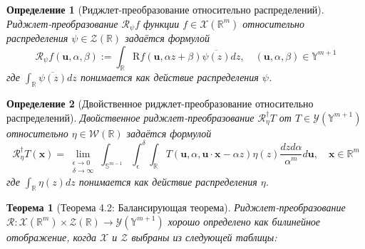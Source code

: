 \documentclass[12pt]{article}
\newtheorem{theorem}{Теорема}
\newtheorem{definition}{Определение}
\begin{document}
\begin{definition}[Риджлет-преобразование относительно распределений]
	Риджлет-преобразование \( \mathscr{R}_{\psi}f \) функции \( f \in \mathcal{X}(\mathbb{R}^m) \) относительно распределения \( \psi \in \mathcal{Z}(\mathbb{R}) \) задаётся формулой
	\[
	\mathscr{R}_{\psi}f(\mathbf{u}, \alpha, \beta) := \int_{\mathbb{R}} \mathrm{R}f(\mathbf{u}, \alpha z + \beta) \overline{\psi(z)}dz, \quad (\mathbf{u}, \alpha, \beta) \in \mathbb{Y}^{m+1}
	\]
	где \( \int_{\mathbb{R}} \overline{\psi(z)}dz \) понимается как действие распределения \( \psi \).
\end{definition}

\begin{definition}[Двойственное риджлет-преобразование относительно распределений]
	Двойственное риджлет-преобразование \( \mathscr{R}_\eta^\dagger T \) от \( T \in \mathcal{Y}(\mathbb{Y}^{m+1}) \) относительно \( \eta \in \mathcal{W}(\mathbb{R}) \) задаётся формулой
	\[
	\mathscr{R}_\eta^\dagger T(\mathbf{x}) = \lim_{\substack{\epsilon \to 0 \\ \delta \to \infty}} \int_{\mathbb{S}^{m-1}} \int_{\epsilon}^{\delta} \int_{\mathbb{R}} T(\mathbf{u}, \alpha, \mathbf{u} \cdot \mathbf{x} - \alpha z) \eta(z) \frac{dz d\alpha}{\alpha^m} d\mathbf{u}, \quad \mathbf{x} \in \mathbb{R}^m
	\]
	где \( \int_{\mathbb{R}} \eta(z)dz \) понимается как действие распределения \( \eta \).
\end{definition}

\begin{theorem}[Теорема 4.2: Балансирующая теорема]
	Риджлет-преобразование \( \mathscr{R} : \mathcal{X}(\mathbb{R}^m) \times \mathcal{Z}(\mathbb{R}) \rightarrow \mathcal{Y}(\mathbb{Y}^{m+1}) \) хорошо определено как билинейное отображение, когда \( \mathcal{X} \) и \( \mathcal{Z} \) выбраны из следующей таблицы:
\end{theorem}
\end{document}

